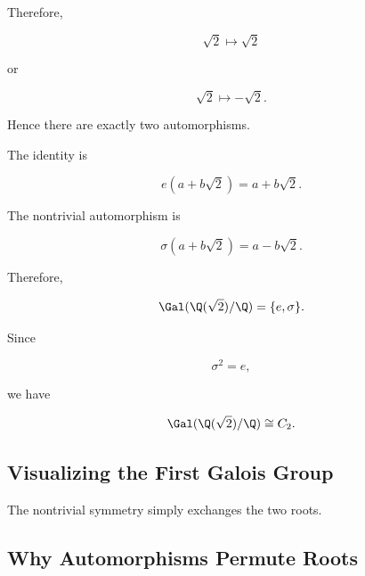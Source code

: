 Therefore,

\[ \sqrt2\mapsto\sqrt2 \]

or

\[ \sqrt2\mapsto-\sqrt2. \]

Hence there are exactly two automorphisms.

The identity is

\[ e(a+b\sqrt2)=a+b\sqrt2. \]

The nontrivial automorphism is

\[ \sigma(a+b\sqrt2)=a-b\sqrt2. \]

Therefore,

\[ \Gal(\Q(\sqrt2)/\Q)=\{e,\sigma\}. \]

Since

\[ \sigma^2=e, \]

we have

\[ \Gal(\Q(\sqrt2)/\Q)\cong C_2. \]

\subsection{Visualizing the First Galois Group}
\label{subsec:visual-first-galois-group}

\begin{center}
\end{center}

The nontrivial symmetry simply exchanges the two roots.

\subsection{Why Automorphisms Permute Roots}
\label{subsec:automorphisms-permute-roots}

